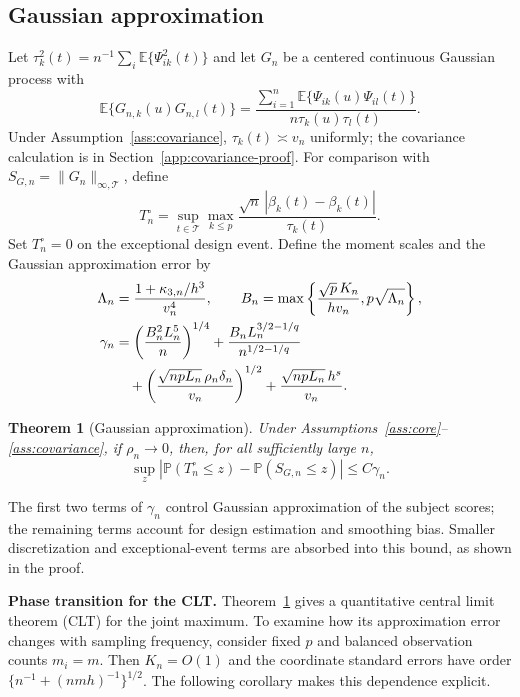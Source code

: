 \documentclass[12pt]{article}
\newtheorem{theorem}{Theorem}
\newcommand{\expect}{\mathbb{E}}
\newcommand{\prob}{\mathbb{P}}
\newcommand{\wh}{\widehat}
\numberwithin{equation}{section}
\begin{document}
\subsection{Gaussian approximation}\label{sec:theory-gaussian}

Let $\tau_k^2(t)=n^{-1}\sum_i\expect\{\Psi_{ik}^2(t)\}$ and let $G_n$ be a
centered continuous Gaussian process with
\begin{equation*}
\expect\{G_{n,k}(u)G_{n,l}(t)\}=
\frac{\sum_{i=1}^n\expect\{\Psi_{ik}(u)\Psi_{il}(t)\}}
{n\tau_k(u)\tau_l(t)}.
\end{equation*}
Under Assumption~\ref{ass:covariance}, $\tau_k(t)\asymp v_n$ uniformly;
the covariance calculation is in Section~\ref{app:covariance-proof}.
For comparison with $S_{G,n}=\|G_n\|_{\infty,\mathcal T}$, define
\[
T_n^\circ=\sup_{t\in\mathcal T}\max_{k\le p}
\frac{\sqrt n\,|\wh\beta_k(t)-\beta_k(t)|}{\tau_k(t)}.
\]
Set $T_n^\circ=0$ on the exceptional design event.
Define the moment scales and the Gaussian approximation error by
\begin{align}
\Lambda_n&=\frac{1+\kappa_{3,n}/h^3}{v_n^4},\qquad
B_n=\max\left\{\frac{\sqrt p\,K_n}{hv_n},p\sqrt{\Lambda_n}\right\},\notag\\
\gamma_n&=\left(\frac{B_n^2L_n^5}{n}\right)^{1/4}
+\frac{B_nL_n^{3/2-1/q}}{n^{1/2-1/q}}\notag\\*
&\quad+\left(\frac{\sqrt{npL_n}\,\rho_n\delta_n}{v_n}\right)^{1/2}
+\frac{\sqrt{npL_n}\,h^s}{v_n}.
\label{eq:gaussian-rate}
\end{align}

\begin{theorem}[Gaussian approximation]\label{thm:gaussian}
Under Assumptions~\ref{ass:core}--\ref{ass:covariance}, if
$\rho_n\to0$, then, for all sufficiently large $n$,
\begin{equation*}
\sup_z\left|\prob(T_n^\circ\le z)-\prob(S_{G,n}\le z)\right|
\le C\gamma_n.
\end{equation*}
\end{theorem}

The first two terms of $\gamma_n$ control Gaussian approximation of
the subject scores; the remaining terms account for design estimation
and smoothing bias. Smaller discretization and exceptional-event terms
are absorbed into this bound, as shown in the proof.

\noindent\textbf{Phase transition for the CLT.}
Theorem~\ref{thm:gaussian} gives a quantitative central limit theorem
(CLT) for the joint maximum. To examine how its approximation error
changes with sampling frequency, consider fixed $p$ and balanced
observation counts $m_i=m$. Then $K_n=O(1)$ and the coordinate standard
errors have order $\{n^{-1}+(nmh)^{-1}\}^{1/2}$. The following
corollary makes this dependence explicit.
\end{document}
